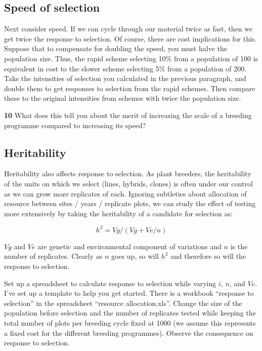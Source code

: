 \documentclass[
]{book}
\makeatletter
\newenvironment{kframe}{%
\medskip{}
\setlength{\fboxsep}{.8em}
 \def\at@end@of@kframe{}%
 \ifinner\ifhmode%
  \def\at@end@of@kframe{\end{minipage}}%
  \begin{minipage}{\columnwidth}%
 \fi\fi%
 \def\FrameCommand##1{\hskip\@totalleftmargin \hskip-\fboxsep
 \colorbox{shadecolor}{##1}\hskip-\fboxsep
     \hskip-\linewidth \hskip-\@totalleftmargin \hskip\columnwidth}%
 \MakeFramed {\advance\hsize-\width
   \@totalleftmargin\z@ \linewidth\hsize
   \@setminipage}}%
 {\par\unskip\endMakeFramed%
 \at@end@of@kframe}
\newenvironment{rmdblock}[1]
  {
  \begin{itemize}
  \renewcommand{\labelitemi}{
    \raisebox{-.7\height}[0pt][0pt]{
      {\setkeys{Gin}{width=3em,keepaspectratio}\texttt{[image: images/\#1]}}
    }
  }
  \setlength{\fboxsep}{1em}
  \begin{kframe}
  \item
  }
  {
  \end{kframe}
  \end{itemize}
  }
\newenvironment{rmdquiz}
  {\begin{rmdblock}{quiz}}
  {\end{rmdblock}}
\makeatother
\begin{document}
\hypertarget{speed-of-selection}{%
\subsection{Speed of selection}\label{speed-of-selection}}

Next consider speed. If we can cycle through our material twice as fast, then we get twice the response to selection. Of course, there are cost implications for this. Suppose that to compensate for doubling the speed, you must halve the population size. Thus, the rapid scheme selecting 10\% from a population of 100 is equivalent in cost to the slower scheme selecting 5\% from a population of 200. Take the intensities of selection you calculated in the previous paragraph, and double them to get responses to selection from the rapid schemes. Then compare these to the original intensities from schemes with twice the population size.

\begin{rmdquiz}
\textbf{10}
What does this tell you about the merit of increasing the scale of a breeding programme compared to increasing its speed?
\end{rmdquiz}

\hypertarget{heritability}{%
\subsection{Heritability}\label{heritability}}

Heritability also affects response to selection. As plant breeders, the heritability of the units on which we select (lines, hybrids, clones) is often under our control as we can grow more replicates of each. Ignoring subtleties about allocation of resource between sites / years / replicate plots, we can study the effect of testing more extensively by taking the heritability of a candidate for selection as:

\[h^2   = Vg / (Vg + Ve/n)\]

\(Vg\) and \(Ve\) are genetic and environmental component of variations and \(n\) is the number of replicates. Clearly as \(n\) goes up, so will \(h^2\) and therefore so will the response to selection.

Set up a spreadsheet to calculate response to selection while varying \(i\), \(n\), and \(Ve\). I've set up a template to help you get started. There is a workbook ``response to selection'' in the spreadsheet ``resource allocation.xls''. Change the size of the population before selection and the number of replicates tested while keeping the total number of plots per breeding cycle fixed at 1000 (we assume this represents a fixed cost for the different breeding programmes). Observe the consequence on response to selection.
\end{document}
